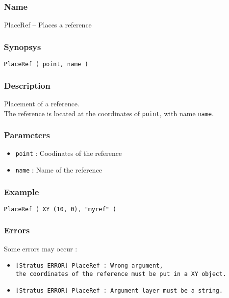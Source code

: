 \subsubsection{Name}

PlaceRef -- Places a reference

\subsubsection{Synopsys}

\begin{verbatim}
PlaceRef ( point, name )
\end{verbatim}

\subsubsection{Description}

Placement of a reference.\\
\indent The reference is located at the coordinates of \verb-point-, with name \verb-name-.
    
\subsubsection{Parameters}

\begin{itemize}
    \item \verb-point- : Coodinates of the reference
    \item \verb-name- : Name of the reference
\end{itemize}
    
\subsubsection{Example}

\begin{verbatim}
PlaceRef ( XY (10, 0), "myref" )
\end{verbatim}

\subsubsection{Errors}
    
Some errors may occur :
\begin{itemize}
    \item \verb-[Stratus ERROR] PlaceRef : Wrong argument,-\\\verb-the coordinates of the reference must be put in a XY object.-
    \item \verb-[Stratus ERROR] PlaceRef : Argument layer must be a string.-
\end{itemize}

